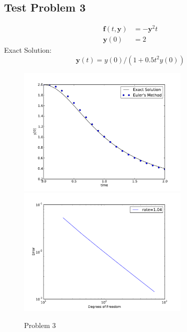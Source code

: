 \documentclass[10pt,letterpaper]{article}
\def\y{\mathbf{y}}
\def\f{\mathbf{f}}
\begin{document}
\subsection*{Test Problem 3}
\begin{align*}
\f(t,\y) &= -\y^2t\\
\y(0) &= 2
\end{align*}
Exact Solution:
\[
\y(t)=y(0)/(1+0.5t^2y(0))
\]
\begin{figure}[h!]
\centering
\includegraphics[width=3.25in,keepaspectratio=true]{./p3_1.pdf}
\includegraphics[width=3.25in,keepaspectratio=true]{./p3_2.pdf}
\caption{Problem 3}
\end{figure}
\end{document}
